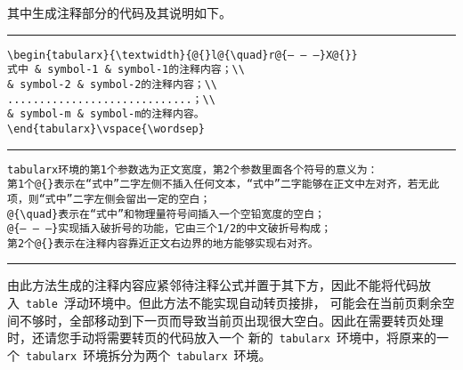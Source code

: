 
其中生成注释部分的代码及其说明如下。

\vspace{1em}\noindent\hrule

\begin{verbatim}
\begin{tabularx}{\textwidth}{@{}l@{\quad}r@{— — —}X@{}}
式中 & symbol-1 & symbol-1的注释内容；\\
& symbol-2 & symbol-2的注释内容；\\
.............................；\\
& symbol-m & symbol-m的注释内容。
\end{tabularx}\vspace{\wordsep}
\end{verbatim}

\noindent\hrule

\begin{verbatim}
tabularx环境的第1个参数选为正文宽度，第2个参数里面各个符号的意义为：
第1个@{}表示在“式中”二字左侧不插入任何文本，“式中”二字能够在正文中左对齐，若无此项，则“式中”二字左侧会留出一定的空白；
@{\quad}表示在“式中”和物理量符号间插入一个空铅宽度的空白；
@{— — —}实现插入破折号的功能，它由三个1/2的中文破折号构成；
第2个@{}表示在注释内容靠近正文右边界的地方能够实现右对齐。
\end{verbatim}

\noindent\hrule\vspace{1em}

由此方法生成的注释内容应紧邻待注释公式并置于其下方，因此不能将代码放入~\verb|table|~浮动环境中。但此方法不能实现自动转页接排，
可能会在当前页剩余空间不够时，全部移动到下一页而导致当前页出现很大空白。因此在需要转页处理时，还请您手动将需要转页的代码放入一个
新的~\verb|tabularx|~环境中，将原来的一个~\verb|tabularx|~环境拆分为两个~\verb|tabularx|~环境。

